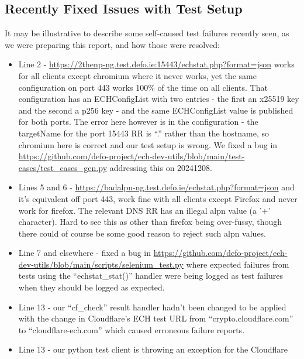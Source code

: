 
\subsection{Recently Fixed Issues with Test Setup}

It may be illustrative to describe some self-caused test failures recently
seen, as we were preparing this report, and how those were resolved:

\begin{itemize}
\item Line 2 - \url{https://2thenp-ng.test.defo.ie:15443/echstat.php?format=json} works for all
    clients except chromium where it never works, yet the same configuration on port 443 works
    100\% of the time on all clients. That configuration has an ECHConfigList with two
    entries - the first an x25519 key and the second a p256 key - and the same ECHConfigList 
    value is published for both ports. The error here however is in the configuration - the
    targetName for the port 15443 RR is ``.'' rather than the hostname, so chromium here
    is correct and our test setup is wrong. We fixed a bug in 
    \url{https://github.com/defo-project/ech-dev-utils/blob/main/test-cases/test_cases_gen.py}
        addressing this on 20241208.\\
\item Lines 5 and 6 - \url{https://badalpn-ng.test.defo.ie/echstat.php?format=json} and
    it's equivalent off port 443, work fine with all clients except Firefox and never work
    for firefox. The relevant DNS RR has an illegal alpn value (a '+' character). Hard to
    see this as other than firefox being over-fussy, though there could of course be some
    good reason to reject such alpn values.
\item Line 7 and elsewhere - fixed a bug in 
    \url{https://github.com/defo-project/ech-dev-utils/blob/main/scripts/selenium_test.py} where
        expected failures from tests using the ``echstat\_stat()'' handler were being logged as 
        test failures when they should be logged as expected.
    \item Line 13 - our ``cf\_check'' result handler hadn't been changed to be applied 
        with the change in Cloudflare's ECH test URL from ``crypto.cloudflare.com'' to
        ``cloudflare-ech.com'' which caused erroneous failure reports.
    \item Line 13 - our python test client is throwing an exception for the Cloudflare

\end{itemize}
